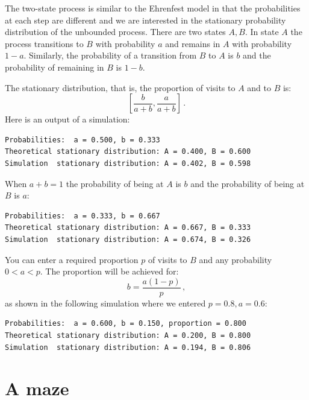 \documentclass[11pt,a4paper]{article}
\begin{document}
The two-state process is similar to the Ehrenfest model in that the probabilities at each step are different and we are interested in the stationary probability distribution of the unbounded process. There are two states $A,B$. In state $A$ the process transitions to $B$  with probability $a$ and remains in $A$ with probability $1-a$. Similarly, the probability of a transition from $B$ to $A$ is $b$ and the probability of remaining in $B$ is $1-b$.
\begin{center}
\end{center}
The stationary distribution, that is, the proportion of visits to $A$ and to $B$ is:
\[
\left[\frac{b}{a+b}, \frac{a}{a+b}\right]\,.
\]
Here is an output of a simulation:
\begin{verbatim}
Probabilities:  a = 0.500, b = 0.333
Theoretical stationary distribution: A = 0.400, B = 0.600
Simulation  stationary distribution: A = 0.402, B = 0.598
\end{verbatim}
When $a+b=1$ the probability of being at $A$ is $b$ and the probability of being at $B$ is $a$:
\begin{verbatim}
Probabilities:  a = 0.333, b = 0.667
Theoretical stationary distribution: A = 0.667, B = 0.333
Simulation  stationary distribution: A = 0.674, B = 0.326
\end{verbatim}
You can enter a required proportion $p$ of visits to $B$ and any probability $0<a<p$. The proportion will be achieved for:
\[
b = \frac{a(1-p)}{p}\,,
\]
as shown in the following simulation where we entered $p=0.8, a=0.6$:
\begin{verbatim}
Probabilities:  a = 0.600, b = 0.150, proportion = 0.800
Theoretical stationary distribution: A = 0.200, B = 0.800
Simulation  stationary distribution: A = 0.194, B = 0.806
\end{verbatim}


\section{A maze}\label{maze}
\end{document}
